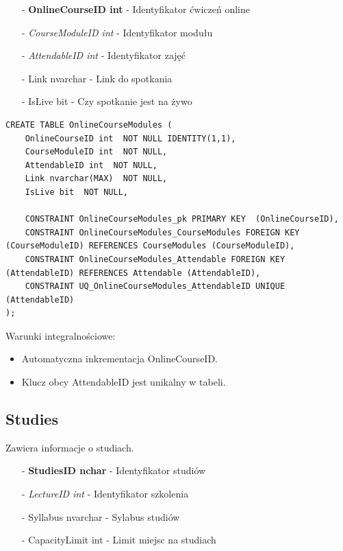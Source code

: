 \documentclass[11pt,a4paper]{article}
\begin{document}
\begin{itemize}
    \item[-] \textbf{OnlineCourseID int} - Identyfikator ćwiczeń online
    \item[-] \textit{CourseModuleID int} - Identyfikator modułu
    \item[-] \textit{AttendableID int} - Identyfikator zajęć
    \item[-] Link nvarchar - Link do spotkania
    \item[-] IsLive bit - Czy spotkanie jest na żywo
\end{itemize}

\begin{Verbatim}[breaklines=true]
CREATE TABLE OnlineCourseModules (
    OnlineCourseID int  NOT NULL IDENTITY(1,1),
    CourseModuleID int  NOT NULL,
    AttendableID int  NOT NULL,
    Link nvarchar(MAX)  NOT NULL,
    IsLive bit  NOT NULL,

    CONSTRAINT OnlineCourseModules_pk PRIMARY KEY  (OnlineCourseID),
    CONSTRAINT OnlineCourseModules_CourseModules FOREIGN KEY (CourseModuleID) REFERENCES CourseModules (CourseModuleID),
    CONSTRAINT OnlineCourseModules_Attendable FOREIGN KEY (AttendableID) REFERENCES Attendable (AttendableID),
    CONSTRAINT UQ_OnlineCourseModules_AttendableID UNIQUE (AttendableID)
);
\end{Verbatim}

Warunki integralnościowe:
\begin{itemize}
    \item Automatyczna inkrementacja OnlineCourseID.
    \item Klucz obcy AttendableID jest unikalny w tabeli.
\end{itemize}

\subsection{Studies}
Zawiera informacje o studiach.

\begin{itemize}
    \item[-] \textbf{StudiesID nchar} - Identyfikator studiów
    \item[-] \textit{LectureID int} - Identyfikator szkolenia
    \item[-] Syllabus nvarchar - Sylabus studiów
    \item[-] CapacityLimit int - Limit miejsc na studiach
\end{itemize}
\end{document}
